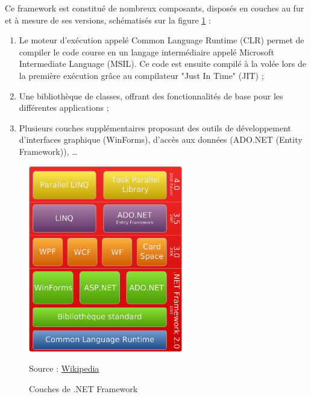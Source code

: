 Ce framework est constitué de nombreux composants, disposés en couches au fur et à mesure de ses versions, schématisés sur la figure \ref{NET_Framework} :
\begin{enumerate}
	\item Le moteur d'exécution appelé Common Language Runtime (CLR) permet de compiler le code course en un langage intermédiaire appelé Microsoft Intermediate Language (MSIL).
Ce code est ensuite compilé à la volée lors de la première exécution grâce au compilateur "Just In Time" (JIT) ;
	\item Une bibliothèque de classes, offrant des fonctionnalités de base pour les différentes applications ;
	\item Plusieurs couches supplémentaires proposant des outils de développement d'interfaces graphique (WinForms), d'accès aux données (ADO.NET (Entity Framework)), \ldots
\end{enumerate}
\begin{figure}[!h]
	\center
	\includegraphics[width=0.6\textwidth]{img/NET_Framework.png}
	\caption{Couches de .NET Framework}
	Source : \href{http://fr.wikipedia.org/wiki/Framework\_.NET}{Wikipedia}
	\label{NET_Framework}
\end{figure}

